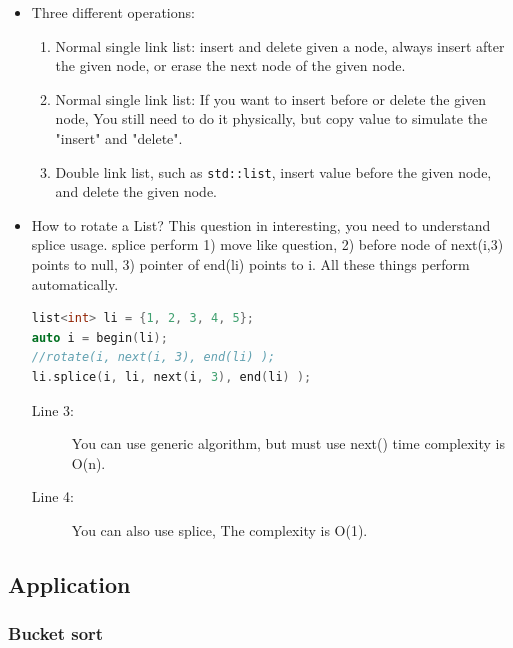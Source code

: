 \documentclass[a4paper,11pt,twoside]{book}
\begin{document}
\begin{itemize}

\item Three different operations:
\begin{enumerate}
	\item Normal single link list: insert and delete given a node, always insert after the given node, or erase the next node of the given node. 
	
	\item Normal single link list: If you want to insert before or delete the given node, You still need to do it physically, but copy value to simulate the "insert" and "delete". 
	
	\item Double link list, such as \texttt{std::list}, insert value before the given node, and delete the given node. 
\end{enumerate}


\item How to rotate a List? This question in interesting, you need to understand splice usage. splice perform 1) move like question, 2) before node of next(i,3) points to null, 3) pointer of end(li) points to i. All these things perform automatically. 

\begin{lstlisting}[frame=single, language=c++]
list<int> li = {1, 2, 3, 4, 5};
auto i = begin(li);
//rotate(i, next(i, 3), end(li) );
li.splice(i, li, next(i, 3), end(li) );
\end{lstlisting}
\begin{description}
	\item[Line 3:] You can use generic algorithm, but must use next() time complexity is O(n).
	\item[Line 4:] You can also use splice, The complexity is O(1).
\end{description}

\end{itemize} 

\subsection{Application}
\subsubsection{Bucket sort}
\end{document}
